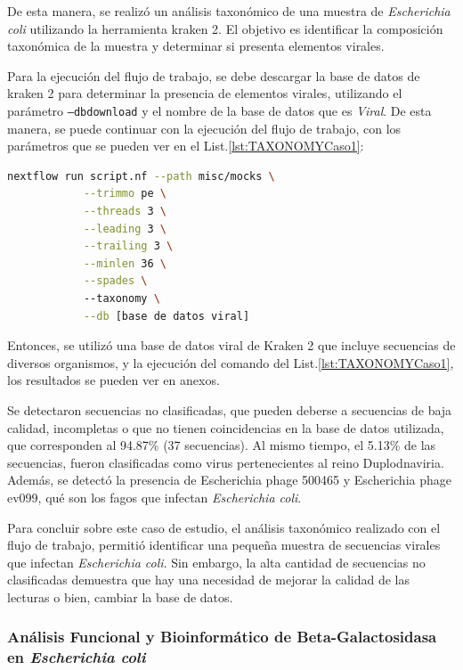 \documentclass[12pt]{article}
\begin{document}
De esta manera, se realizó un análisis taxonómico de una muestra de 
\textit{Escherichia coli} utilizando la herramienta kraken 2. El objetivo es 
identificar la composición taxonómica de la muestra y determinar si 
presenta elementos virales.

Para la ejecución del flujo de trabajo, se debe descargar la 
base de datos de kraken 2 para determinar la presencia de elementos 
virales, utilizando el parámetro \texttt{--dbdownload} y el nombre de la base 
de datos que es \emph{Viral}. De esta manera, se puede continuar con la 
ejecución del flujo de trabajo, con los parámetros que se pueden ver 
en el List.\ref{lst:TAXONOMYCaso1}:


\begin{center}
    \begin{lstlisting}[language=bash, caption=Comando para la identificación taxonómica de \textit{Escherichia coli} \emph{(elaboración propia)}., label=lst:TAXONOMYCaso1]
        nextflow run script.nf --path misc/mocks \
            --trimmo pe \
            --threads 3 \
            --leading 3 \
            --trailing 3 \
            --minlen 36 \
            --spades \ 
            --taxonomy \
            --db [base de datos viral]
    \end{lstlisting}
\end{center}


Entonces, se utilizó una base de datos viral de Kraken 2 que 
incluye secuencias de diversos organismos, y la ejecución del 
comando del List.\ref{lst:TAXONOMYCaso1}, los resultados 
se pueden ver en anexos.

Se detectaron secuencias no clasificadas, que pueden deberse a 
secuencias de baja calidad, incompletas o que no tienen 
coincidencias en la base de datos utilizada, que corresponden 
al 94.87\% (37 secuencias). Al mismo tiempo, el  5.13\% de las 
secuencias, fueron clasificadas como virus pertenecientes 
al reino Duplodnaviria. Además, se detectó la presencia 
de Escherichia phage 500465 y Escherichia phage ev099, 
qué son los fagos que infectan \textit{Escherichia coli}.

Para concluir sobre este caso de estudio, el análisis 
taxonómico realizado con el flujo de trabajo, permitió 
identificar una pequeña muestra de secuencias virales que 
infectan \textit{Escherichia coli}. Sin embargo, la alta 
cantidad de secuencias 
no clasificadas demuestra que hay una necesidad de mejorar 
la calidad de las lecturas o bien, cambiar la base de datos.

\subsubsection*{Análisis Funcional y Bioinformático de 
Beta-Galactosidasa en \textit{Escherichia coli}}
\end{document}
